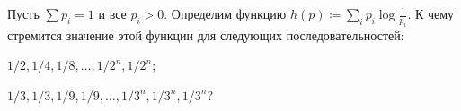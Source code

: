 Пусть $\sum p_i = 1$ и все $p_i > 0$. Определим функцию $h(p) \coloneqq
\sum\limits_{i} p_i \log \frac{1}{p_i}$.
К чему стремится значение этой функции для следующих последовательностей:
\begin{enumcyr}
    \item $1 / 2, 1 / 4, 1 / 8, \dots, 1 / 2^n, 1 / 2^n$;
    \item $1 / 3, 1 / 3, 1 / 9, 1 / 9, \dots, 1 / 3^n, 1 / 3^n, 1 / 3^n$?
\end{enumcyr}
